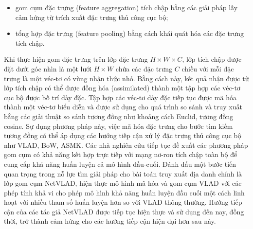 \begin{itemize}
    \item gom cụm đặc trưng (feature aggregation) tích chập bằng các giải pháp lấy cảm hứng từ trích xuất đặc trưng thủ công cục bộ;
    \item tổng hợp đặc trưng (feature pooling) bằng cách khái quát hóa các đặc trưng tích chập.
\end{itemize}

Khi thực hiện gom đặc trưng trên lớp đặc trưng \(H \times W \times C\), lớp tích chập được đặt dưới góc nhìn là một lưới \(H \times W \) chứa các đặc trưng \(C\) chiều với mỗi đặc trưng là một véc-tơ có vùng nhận thức nhỏ. Bằng cách này, kết quả nhận được từ lớp tích chập có thể được đồng hóa (assimilated) thành một tập hợp các véc-tơ cục bộ được bố trí dày đặc. Tập hợp các véc-tơ dày đặc tiếp tục được mã hóa thành một véc-tơ biểu diễn và được sử dụng cho quá trình so sánh và truy xuất bằng các giải thuật so sánh tương đồng như khoảng cách Euclid, tương đồng cosine. Sự dụng phương pháp này, việc mã hóa đặc trưng cho bước tìm kiếm tương đồng có thể áp dụng các hướng tiếp cận xử lý đặc trưng thủ công cục bộ như VLAD\cite{vlad}, BoW\cite{Mohedano_2016}, ASMK\cite{cao2020unifying}. Các nhà nghiên cứu tiếp tục đề xuất các phương pháp gom cụm có khả năng kết hợp trực tiếp với mạng nơ-ron tích chập toàn bộ để cung cấp khả năng huấn luyện cả mô hình đầu-cuối\cite{ong2017siamese}. Đánh dấu một bước tiến quan trọng trong nỗ lực tìm giải pháp cho bài toán truy xuất địa danh chính là lớp gom cụm NetVLAD\cite{arandjelovic2016netvlad}, hiện thực mô hình mã hóa và gom cụm VLAD với các phép tính khả vi cho phép mô hình khả năng huấn luyện đầu cuối một cách linh hoạt với nhiều tham số huấn luyện hơn so với VLAD thông thường. Hướng tiếp cận của các tác giả NetVLAD được tiếp tục hiện thực và sử dụng đến nay, đồng thời, trở thành cảm hứng cho các hướng tiếp cận hiện đại hơn sau này.

